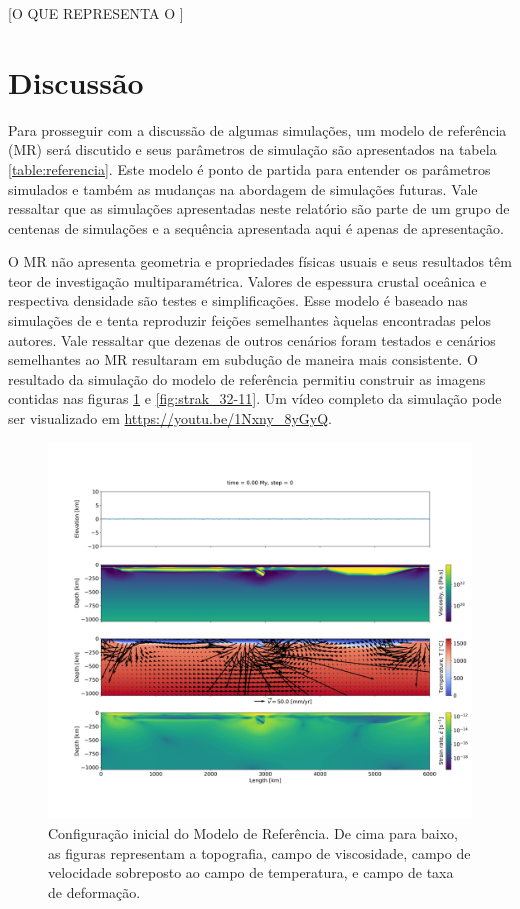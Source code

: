 [O QUE REPRESENTA O ]

\section{Discussão}

Para prosseguir com a discussão de algumas simulações, um modelo de referência (MR) será discutido e seus parâmetros de simulação são apresentados na tabela \ref{table:referencia}. Este modelo é ponto de partida para entender os parâmetros simulados e também as mudanças na abordagem de simulações futuras. Vale ressaltar que as simulações apresentadas neste relatório são parte de um grupo de centenas de simulações e a sequência apresentada aqui é apenas de apresentação.

 

O MR não apresenta geometria e propriedades físicas usuais e seus resultados têm teor de investigação multiparamétrica. Valores de espessura crustal oceânica e respectiva densidade são testes e simplificações. Esse modelo é baseado nas simulações de \citet{strak2021thermo} e tenta reproduzir feições semelhantes àquelas encontradas pelos autores. Vale ressaltar que dezenas de outros cenários foram testados e cenários semelhantes ao MR resultaram em subdução de maneira mais consistente. O resultado da simulação do modelo de referência permitiu construir as imagens contidas nas figuras \ref{fig:strak_32-00} e \ref{fig:strak_32-11}. Um vídeo completo da simulação pode ser visualizado em \url{https://youtu.be/1Nxny_8yGyQ}.

\begin{figure}
    \centering
    \includegraphics[trim={5cm 14cm 2cm 12cm}, clip, width=1.0 \textwidth]{fig/strak_32-00.png}
    \caption{Configuração inicial do Modelo de Referência. De cima para baixo, as figuras representam a topografia, campo de viscosidade, campo de velocidade sobreposto ao campo de temperatura, e campo de taxa de deformação.}
    \label{fig:strak_32-00}
\end{figure}

